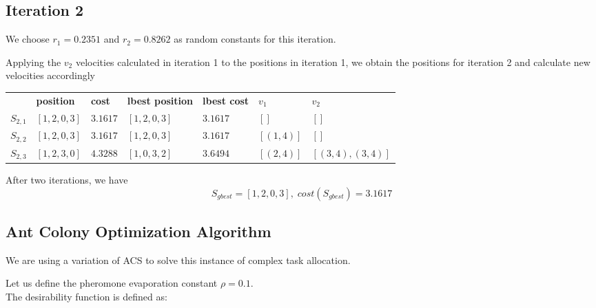 \documentclass[a4paper]{article}
\begin{document}
\subsection{Iteration 2}

We choose $r_1 = 0.2351$ and $r_2 = 0.8262$ as random constants for this
iteration.

Applying the $v_2$ velocities calculated in iteration 1 to the positions in
iteration 1, we obtain the positions for iteration 2 and calculate new
velocities accordingly
\begin{center}
\begin{tabular}{lllllll}
          & \textbf{position} & \textbf{cost} & \textbf{lbest position} & \textbf{lbest cost} & $v_1$      & $v_2$            \\
$S_{2,1}$ & $[1, 2, 0, 3]$    & $3.1617$      & $[1, 2, 0, 3]$          & $3.1617$            & $[]      $ & $[]$             \\
$S_{2,2}$ & $[1, 2, 0, 3]$    & $3.1617$      & $[1, 2, 0, 3]$          & $3.1617$            & $[(1, 4)]$ & $[]$             \\
$S_{2,3}$ & $[1, 2, 3, 0]$    & $4.3288$      & $[1, 0, 3, 2]$          & $3.6494$            & $[(2, 4)]$ & $[(3,4), (3,4)]$ \\
\end{tabular}
\end{center}
\vspace{1.5em}

After two iterations, we have
$$S_\mathit{gbest} = [1, 2, 0, 3], \; cost(S_\mathit{gbest}) = 3.1617$$

\subsection{Ant Colony Optimization Algorithm} %

We are using a variation of ACS to solve this instance of complex task allocation.

Let us define the pheromone evaporation constant $\rho=0.1$.\\
The desirability function is defined as:
\end{document}
